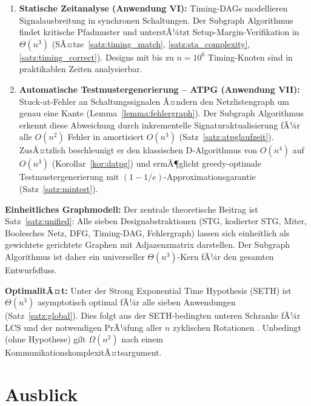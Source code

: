 ﻿\documentclass[a4paper,12pt]{article}
\theoremstyle{definition}
\begin{document}
\begin{enumerate}
  \item \textbf{Statische Zeitanalyse (Anwendung VI):} Timing-DAGs modellieren
        Signalausbreitung in synchronen Schaltungen. Der Subgraph Algorithmus findet
        kritische Pfadmuster und unterstÃ¼tzt Setup-Margin-Verifikation in $\Theta(n^3)$
        (SÃ¤tze~\ref{satz:timing_match}, \ref{satz:sta_complexity},
        \ref{satz:timing_correct}). Designs mit bis zu $n = 10^6$ Timing-Knoten sind
        in praktikablen Zeiten analysierbar.

  \item \textbf{Automatische Testmustergenerierung -- ATPG (Anwendung VII):}
        Stuck-at-Fehler an Schaltungssignalen Ã¤ndern den Netzlistengraph um genau
        eine Kante (Lemma~\ref{lemma:fehlergraph}). Der Subgraph Algorithmus erkennt
        diese Abweichung durch inkrementelle Signaturaktualisierung fÃ¼r alle
        $O(n^2)$ Fehler in amortisiert $O(n^3)$ (Satz~\ref{satz:atpglaufzeit}).
        ZusÃ¤tzlich beschleunigt er den klassischen D-Algorithmus von $O(n^4)$ auf
        $O(n^3)$ (Korollar~\ref{kor:datpg}) und ermÃ¶glicht greedy-optimale
        Testmustergenerierung mit $(1-1/e)$-Approximationsgarantie
        (Satz~\ref{satz:mintest}).
\end{enumerate}

\textbf{Einheitliches Graphmodell:} Der zentrale theoretische Beitrag ist
Satz~\ref{satz:unified}: Alle sieben Designabstraktionen (STG, kodierter STG,
Miter, Boolesches Netz, DFG, Timing-DAG, Fehlergraph) lassen sich einheitlich als
gewichtete gerichtete Graphen mit Adjazenzmatrix darstellen. Der Subgraph Algorithmus
ist daher ein universeller $\Theta(n^3)$-Kern fÃ¼r den gesamten Entwurfsfluss.

\textbf{OptimalitÃ¤t:} Unter der Strong Exponential Time Hypothesis (SETH) ist
$\Theta(n^3)$ asymptotisch optimal fÃ¼r alle sieben Anwendungen (Satz~\ref{satz:global}).
Dies folgt aus der SETH-bedingten unteren Schranke fÃ¼r LCS \cite{abboud2015tight}
und der notwendigen PrÃ¼fung aller $n$ zyklischen Rotationen \cite{subgraph2026}.
Unbedingt (ohne Hypothese) gilt $\Omega(n^2)$ nach einem KommunikationskomplexitÃ¤tsargument.

\section{Ausblick}
\label{sec:ausblick}
\end{document}
